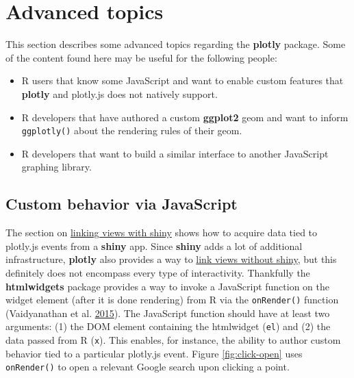 \documentclass[12pt,]{isuthesis}
\providecommand{\tightlist}{%
  \setlength{\itemsep}{0pt}\setlength{\parskip}{0pt}}
\begin{document}
\section{Advanced topics}\label{advanced-topics}

This section describes some advanced topics regarding the
\textbf{plotly} package. Some of the content found here may be useful
for the following people:

\begin{itemize}
\tightlist
\item
  R users that know some JavaScript and want to enable custom features
  that \textbf{plotly} and plotly.js does not natively support.
\item
  R developers that have authored a custom \textbf{ggplot2} geom and
  want to inform \texttt{ggplotly()} about the rendering rules of their
  geom.
\item
  R developers that want to build a similar interface to another
  JavaScript graphing library.
\end{itemize}

\subsection{Custom behavior via
JavaScript}\label{custom-behavior-via-javascript}

The section on \protect\hyperlink{linking-views-with-shiny}{linking
views with shiny} shows how to acquire data tied to plotly.js events
from a \textbf{shiny} app. Since \textbf{shiny} adds a lot of additional
infrastructure, \textbf{plotly} also provides a way to
\protect\hyperlink{linking-views-without-shiny}{link views without
shiny}, but this definitely does not encompass every type of
interactivity. Thankfully the \textbf{htmlwidgets} package provides a
way to invoke a JavaScript function on the widget element (after it is
done rendering) from R via the \texttt{onRender()} function
(Vaidyanathan et al. \protect\hyperlink{ref-htmlwidgets}{2015}). The
JavaScript function should have at least two arguments: (1) the DOM
element containing the htmlwidget (\texttt{el}) and (2) the data passed
from R (\texttt{x}). This enables, for instance, the ability to author
custom behavior tied to a particular plotly.js event. Figure
\ref{fig:click-open} uses \texttt{onRender()} to open a relevant Google
search upon clicking a point.
\end{document}
